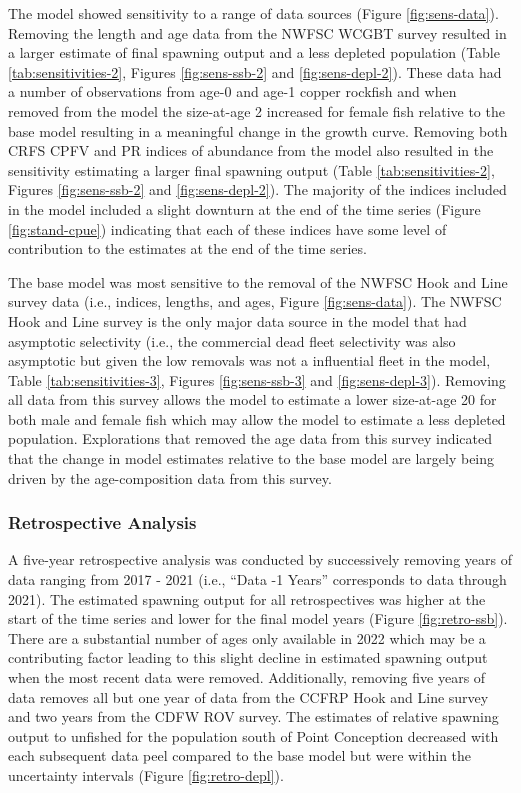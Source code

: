 \documentclass[11pt,
  english,
  letterpaper,
]{article}
\begin{document}
The model showed sensitivity to a range of data sources (Figure \ref{fig:sens-data}). Removing the length and age data from the NWFSC WCGBT survey resulted in a larger estimate of final spawning output and a less depleted population (Table \ref{tab:sensitivities-2}, Figures \ref{fig:sens-ssb-2} and \ref{fig:sens-depl-2}). These data had a number of observations from age-0 and age-1 copper rockfish and when removed from the model the size-at-age 2 increased for female fish relative to the base model resulting in a meaningful change in the growth curve. Removing both CRFS CPFV and PR indices of abundance from the model also resulted in the sensitivity estimating a larger final spawning output (Table \ref{tab:sensitivities-2}, Figures \ref{fig:sens-ssb-2} and \ref{fig:sens-depl-2}). The majority of the indices included in the model included a slight downturn at the end of the time series (Figure \ref{fig:stand-cpue}) indicating that each of these indices have some level of contribution to the estimates at the end of the time series.

The base model was most sensitive to the removal of the NWFSC Hook and Line survey data (i.e., indices, lengths, and ages, Figure \ref{fig:sens-data}). The NWFSC Hook and Line survey is the only major data source in the model that had asymptotic selectivity (i.e., the commercial dead fleet selectivity was also asymptotic but given the low removals was not a influential fleet in the model, Table \ref{tab:sensitivities-3}, Figures \ref{fig:sens-ssb-3} and \ref{fig:sens-depl-3}). Removing all data from this survey allows the model to estimate a lower size-at-age 20 for both male and female fish which may allow the model to estimate a less depleted population. Explorations that removed the age data from this survey indicated that the change in model estimates relative to the base model are largely being driven by the age-composition data from this survey.

\hypertarget{retrospective-analysis}{%
\subsubsection{Retrospective Analysis}\label{retrospective-analysis}}

A five-year retrospective analysis was conducted by successively removing years of data ranging from 2017 - 2021 (i.e., ``Data -1 Years'' corresponds to data through 2021). The estimated spawning output for all retrospectives was higher at the start of the time series and lower for the final model years (Figure \ref{fig:retro-ssb}). There are a substantial number of ages only available in 2022 which may be a contributing factor leading to this slight decline in estimated spawning output when the most recent data were removed. Additionally, removing five years of data removes all but one year of data from the CCFRP Hook and Line survey and two years from the CDFW ROV survey. The estimates of relative spawning output to unfished for the population south of Point Conception decreased with each subsequent data peel compared to the base model but were within the uncertainty intervals (Figure \ref{fig:retro-depl}).
\end{document}
